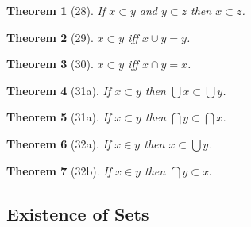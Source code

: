 \documentclass{scrartcl}
\newenvironment{forthel}{\begin{leftbar}}{\end{leftbar}}
\newtheorem*{theorem}{Theorem}
\begin{document}
\begin{forthel}
\begin{theorem}[28] If $x \subset y$ and $y \subset z$ then $x \subset z$.
\end{theorem}

\begin{theorem}[29] $x \subset y$ iff $x \cup y = y$.
\end{theorem}

\begin{theorem}[30] $x \subset y$ iff $x \cap y = x$.
\end{theorem}



\begin{theorem}[31a] If $x \subset y$ then $\bigcup x \subset \bigcup y$.
\end{theorem}

\begin{theorem}[31a] If $x \subset y$ then $\bigcap y \subset \bigcap x$.
\end{theorem}

\begin{theorem}[32a] If $x \in y$ then $x \subset \bigcup y$.
\end{theorem}

\begin{theorem}[32b] If $x \in y$ then $\bigcap y \subset x$.
\end{theorem}

\end{forthel}

\subsection{Existence of Sets}
\end{document}
